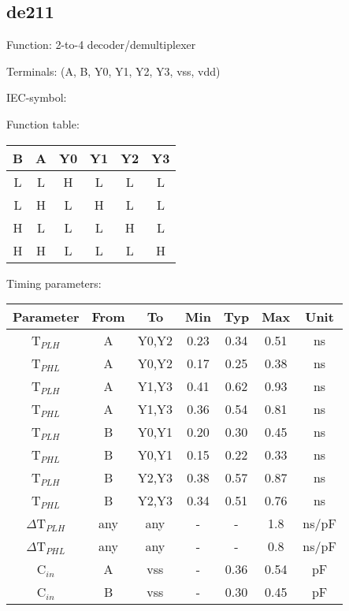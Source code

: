 \subsection{de211}

Function: 2-to-4 decoder/demultiplexer

Terminals: (A, B, Y0, Y1, Y2, Y3, vss, vdd)


IEC-symbol:
\begin{figure}[bth]
\end{figure}

Function table:
\begin{table}[bth]
\begin{tabular}{|cc||cccc|}
\hline
B	&A	&Y0	&Y1	&Y2	&Y3\\
\hline
L	&L	&H	&L	&L	&L\\
L	&H	&L	&H	&L	&L\\
H	&L	&L	&L	&H	&L\\
H	&H	&L	&L	&L	&H\\	
\hline
\end{tabular}
\vspace{1cm}


Timing parameters:\\

\begin{tabular}{|c|cc|ccc|c|}
\hline
Parameter               &From            &To   &Min	&Typ	&Max    &Unit\\
\hline
T$_{PLH}$               &A     		&Y0,Y2  &0.23	&0.34	&0.51    &ns\\
T$_{PHL}$               &A     		&Y0,Y2  &0.17	&0.25	&0.38    &ns\\
T$_{PLH}$               &A     		&Y1,Y3  &0.41	&0.62	&0.93    &ns\\
T$_{PHL}$               &A     		&Y1,Y3  &0.36	&0.54	&0.81    &ns\\
T$_{PLH}$               &B	    	&Y0,Y1  &0.20	&0.30	&0.45    &ns\\
T$_{PHL}$               &B	    	&Y0,Y1  &0.15	&0.22	&0.33    &ns\\
T$_{PLH}$               &B	    	&Y2,Y3  &0.38	&0.57	&0.87    &ns\\
T$_{PHL}$               &B	    	&Y2,Y3  &0.34	&0.51	&0.76    &ns\\
\hline
$\Delta$T$_{PLH}$       &any           &any   &-	&-	&1.8    &ns/pF\\
$\Delta$T$_{PHL}$       &any           &any   &-	&-	&0.8    &ns/pF\\
\hline
C$_{in}$                &A   		&vss    &-	&0.36	&0.54   &pF\\
C$_{in}$                &B             	&vss    &-	&0.30	&0.45   &pF\\
\hline
\end{tabular}
\end{table}

